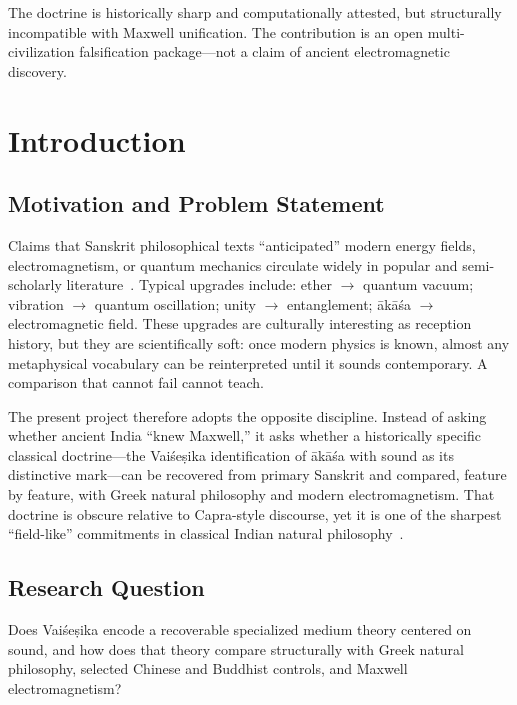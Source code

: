 \documentclass[12pt]{article}
\newcommand{\Vais}{Vaiśeṣika}
\newcommand{\akasa}{ākāśa}
\begin{document}
\vspace{0.85em}
\noindent
The doctrine is historically sharp and computationally attested, but structurally incompatible with Maxwell unification. The contribution is an open multi-civilization falsification package---not a claim of ancient electromagnetic discovery.

\newpage

\section{Introduction}

\subsection{Motivation and Problem Statement}
Claims that Sanskrit philosophical texts ``anticipated'' modern energy fields, electromagnetism, or quantum mechanics circulate widely in popular and semi-scholarly literature~\citep{capra1975,restivo1983}.
Typical upgrades include: ether $\rightarrow$ quantum vacuum; vibration $\rightarrow$ quantum oscillation; unity $\rightarrow$ entanglement; \akasa{} $\rightarrow$ electromagnetic field.
These upgrades are culturally interesting as reception history, but they are scientifically soft: once modern physics is known, almost any metaphysical vocabulary can be reinterpreted until it sounds contemporary.
A comparison that cannot fail cannot teach.

The present project therefore adopts the opposite discipline.
Instead of asking whether ancient India ``knew Maxwell,'' it asks whether a historically specific classical doctrine---the \Vais{} identification of \akasa{} with sound as its distinctive mark---can be recovered from primary Sanskrit and compared, feature by feature, with Greek natural philosophy and modern electromagnetism.
That doctrine is obscure relative to Capra-style discourse, yet it is one of the sharpest ``field-like'' commitments in classical Indian natural philosophy~\citep{halbfass1992,potter1977}.

\subsection{Research Question}
Does \Vais{} encode a recoverable specialized medium theory centered on sound, and how does that theory compare structurally with Greek natural philosophy, selected Chinese and Buddhist controls, and Maxwell electromagnetism?
\end{document}
